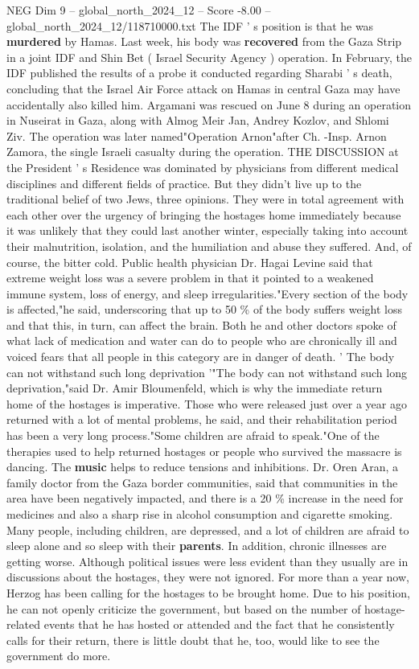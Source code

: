 \begin{textsample}{NEG Dim 9 – global\_north\_2024\_12 – Score -8.00 – global\_north\_2024\_12/118710000.txt}
The IDF ' s position is that he was \textbf{murdered} by Hamas.
Last week, his body was \textbf{recovered} from the Gaza Strip in a joint IDF and Shin Bet ( Israel Security Agency ) operation.
In February, the IDF published the results of a probe it conducted regarding Sharabi ' s death, concluding that the Israel Air Force attack on Hamas in central Gaza may have accidentally also killed him.
Argamani was rescued on June 8 during an operation in Nuseirat in Gaza, along with Almog Meir Jan, Andrey Kozlov, and Shlomi Ziv.
The operation was later named"Operation Arnon"after Ch. -Insp.
Arnon Zamora, the single Israeli casualty during the operation.
THE DISCUSSION at the President ' s Residence was dominated by physicians from different medical disciplines and different fields of practice.
But they didn't live up to the traditional belief of two Jews, three opinions.
They were in total agreement with each other over the urgency of bringing the hostages home immediately because it was unlikely that they could last another winter, especially taking into account their malnutrition, isolation, and the humiliation and abuse they suffered.
And, of course, the bitter cold.
Public health physician Dr.
Hagai Levine said that extreme weight loss was a severe problem in that it pointed to a weakened immune system, loss of energy, and sleep irregularities."Every section of the body is affected,"he said, underscoring that up to 50 \% of the body suffers weight loss and that this, in turn, can affect the brain.
Both he and other doctors spoke of what lack of medication and water can do to people who are chronically ill and voiced fears that all people in this category are in danger of death. ' The body can not withstand such long deprivation '"The body can not withstand such long deprivation,"said Dr.
Amir Bloumenfeld, which is why the immediate return home of the hostages is imperative.
Those who were released just over a year ago returned with a lot of mental problems, he said, and their rehabilitation period has been a very long process."Some children are afraid to speak."One of the therapies used to help returned hostages or people who survived the massacre is dancing.
The \textbf{music} helps to reduce tensions and inhibitions.
Dr.
Oren Aran, a family doctor from the Gaza border communities, said that communities in the area have been negatively impacted, and there is a 20 \% increase in the need for medicines and also a sharp rise in alcohol consumption and cigarette smoking.
Many people, including children, are depressed, and a lot of children are afraid to sleep alone and so sleep with their \textbf{parents}.
In addition, chronic illnesses are getting worse.
Although political issues were less evident than they usually are in discussions about the hostages, they were not ignored.
For more than a year now, Herzog has been calling for the hostages to be brought home.
Due to his position, he can not openly criticize the government, but based on the number of hostage-related events that he has hosted or attended and the fact that he consistently calls for their return, there is little doubt that he, too, would like to see the government do more.


\end{textsample}
